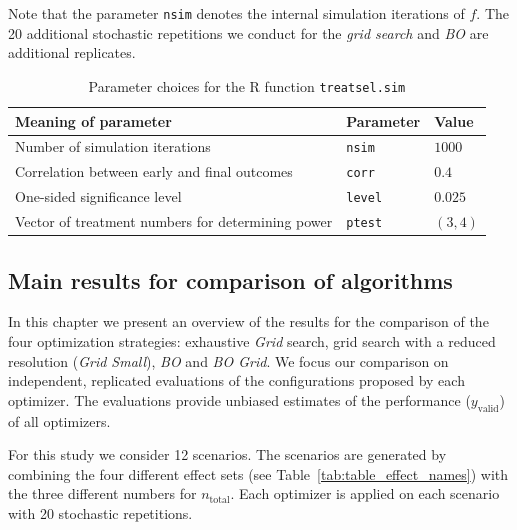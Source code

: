 \documentclass[bimj,fleqn]{w-art}
\theoremstyle{plain}
\theoremstyle{definition}
\begin{document}
Note that the parameter \texttt{nsim} denotes the internal simulation iterations of $f$. 
The 20 additional stochastic repetitions we conduct for the \emph{grid search} and \emph{BO} are additional replicates.

\begin{table}[h]
  \caption{Parameter choices for the R function \texttt{treatsel.sim}}
  \label{tab:par_implement}
  \centering
  \begin{tabular}{lll}
  \hline
  Meaning of parameter & Parameter & Value \\
  \hline
  Number of simulation iterations & \texttt{nsim} & $1000$ \\
  Correlation between early and final outcomes & \texttt{corr} & $0.4$ \\
  One-sided significance level & \texttt{level} & $0.025$ \\
  Vector of treatment numbers for determining power & \texttt{ptest} & $(3,4)$ \\
  \hline
  \end{tabular}
\end{table}

\subsection{Main results for comparison of algorithms}

In this chapter we present an overview of the results for the comparison of the four optimization strategies: exhaustive \emph{Grid} search, grid search with a reduced resolution (\emph{Grid Small}), \emph{BO} and \emph{BO Grid}.
We focus our comparison on independent, replicated evaluations of the configurations proposed by each optimizer.
The evaluations provide unbiased estimates of the performance ($y_{\text{valid}}$) of all optimizers.

For this study we consider 12 scenarios.
The scenarios are generated by combining the four different effect sets (see Table~\ref{tab:table_effect_names}) with the three different numbers for $n_{\text{total}}$.
Each optimizer is applied on each scenario with 20 stochastic repetitions.
\end{document}
